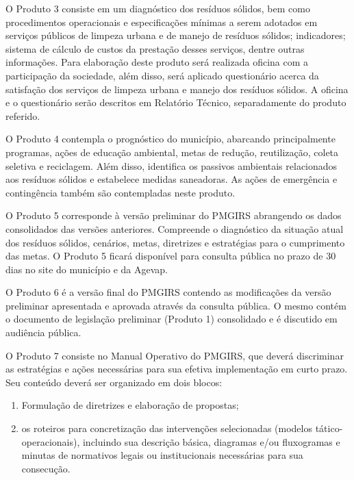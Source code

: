 O Produto 3 consiste em um diagnóstico dos resíduos sólidos, bem como procedimentos operacionais e especificações mínimas a serem adotados em serviços públicos de limpeza urbana e de manejo de resíduos sólidos; indicadores; sistema de cálculo de custos da prestação desses serviços, dentre outras informações. Para elaboração deste produto será realizada oficina com a participação da sociedade, além disso, será aplicado questionário acerca da satisfação dos serviços de limpeza urbana e manejo dos resíduos sólidos. A oficina e o questionário serão descritos em Relatório Técnico, separadamente do produto referido.\vspace{1.5em}

O Produto 4 contempla o prognóstico do município, abarcando principalmente programas, ações de educação ambiental, metas de redução, reutilização, coleta seletiva e reciclagem. Além disso, identifica os passivos ambientais relacionados aos resíduos sólidos e estabelece medidas saneadoras. As ações de emergência e contingência também são contempladas neste produto.\vspace{1.5em}

O Produto 5 corresponde à versão preliminar do PMGIRS abrangendo os dados consolidados das versões anteriores. Compreende o diagnóstico da situação atual dos resíduos sólidos, cenários, metas, diretrizes e estratégias para o cumprimento das metas. O Produto 5 ficará disponível para consulta pública no prazo de 30 dias no site do município e da Agevap.\vspace{1.5em}

O Produto 6 é a versão final do PMGIRS contendo as modificações da versão preliminar apresentada e aprovada através da consulta pública. O mesmo contém o documento de legislação preliminar (Produto 1) consolidado e é discutido em audiência pública.\vspace{1.5em}

O Produto 7 consiste no Manual Operativo do PMGIRS, que deverá discriminar as estratégias e ações necessárias para sua efetiva implementação em curto prazo. Seu conteúdo deverá ser organizado em dois blocos:
\begin{enumerate}[label=\roman*]
	\item Formulação de diretrizes e elaboração de propostas; 
	\item os roteiros para concretização das intervenções selecionadas (modelos tático-operacionais), incluindo sua descrição básica, diagramas e/ou fluxogramas e minutas de normativos legais ou institucionais necessárias para sua consecução.
\end{enumerate}